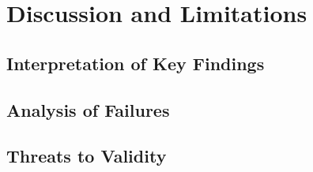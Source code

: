 \chapter{Discussion and Limitations}
\label{chap:discussion}

\section{Interpretation of Key Findings}
\label{sec:interpretation}

\section{Analysis of Failures}
\label{sec:failures}

\section{Threats to Validity}
\label{sec:validity}
